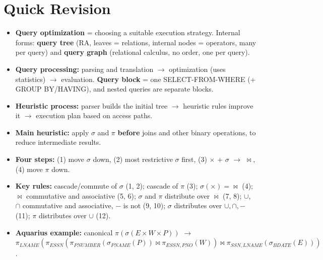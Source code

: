 \documentclass[10pt,a4paper]{article}
\begin{document}
\section{Quick Revision}

\begin{itemize}
  \item \textbf{Query optimization} = choosing a suitable execution strategy. Internal forms: \textbf{query tree} (RA, leaves = relations, internal nodes = operators, many per query) and \textbf{query graph} (relational calculus, no order, one per query).
  \item \textbf{Query processing:} parsing and translation $\to$ optimization (uses statistics) $\to$ evaluation. \textbf{Query block} = one SELECT-FROM-WHERE (+ GROUP BY/HAVING), and nested queries are separate blocks.
  \item \textbf{Heuristic process:} parser builds the initial tree $\to$ heuristic rules improve it $\to$ execution plan based on access paths.
  \item \textbf{Main heuristic:} apply $\sigma$ and $\pi$ \textbf{before} joins and other binary operations, to reduce intermediate results.
  \item \textbf{Four steps:} (1) move $\sigma$ down, (2) most restrictive $\sigma$ first, (3) $\times$ + $\sigma$ $\to$ $\bowtie$, (4) move $\pi$ down.
  \item \textbf{Key rules:} cascade/commute of $\sigma$ (1, 2); cascade of $\pi$ (3); $\sigma(\times) = \bowtie$ (4); $\bowtie$ commutative and associative (5, 6); $\sigma$ and $\pi$ distribute over $\bowtie$ (7, 8); $\cup$, $\cap$ commutative and associative, $-$ is not (9, 10); $\sigma$ distributes over $\cup, \cap, -$ (11); $\pi$ distributes over $\cup$ (12).
  \item \textbf{Aquarius example:} canonical $\pi(\sigma(E \times W \times P))$ $\to$ $\pi_{LNAME}(\pi_{ESSN}(\pi_{PNUMBER}(\sigma_{PNAME}(P)) \bowtie \pi_{ESSN,PNO}(W)) \bowtie \pi_{SSN,LNAME}(\sigma_{BDATE}(E)))$.
\end{itemize}
\end{document}
